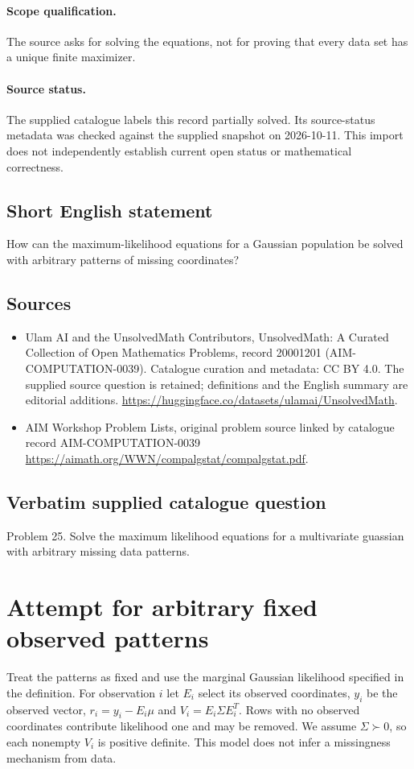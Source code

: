 \documentclass[11pt]{article}
\begin{document}
\paragraph{Scope qualification.}
The source asks for solving the equations, not for proving that every data set has a unique finite maximizer.
\paragraph{Source status.}
The supplied catalogue labels this record partially solved. Its source-status metadata was checked against the supplied snapshot on 2026-10-11. This import does not independently establish current open status or mathematical correctness.
\subsection{Short English statement}
How can the maximum-likelihood equations for a Gaussian population be solved with arbitrary patterns of missing coordinates?
\subsection{Sources}
\begin{itemize}
\item[S1] Ulam AI and the UnsolvedMath Contributors, UnsolvedMath: A Curated Collection of Open Mathematics Problems, record 20001201 (AIM-COMPUTATION-0039). Catalogue curation and metadata: CC BY 4.0. The supplied source question is retained; definitions and the English summary are editorial additions.
\url{https://huggingface.co/datasets/ulamai/UnsolvedMath}.
\item[S2] AIM Workshop Problem Lists, original problem source linked by catalogue record AIM-COMPUTATION-0039
\url{https://aimath.org/WWN/compalgstat/compalgstat.pdf}.
\end{itemize}
\subsection{Verbatim supplied catalogue question}
Problem 25. Solve the maximum likelihood equations for a multivariate guassian with arbitrary missing data patterns.

\section{Attempt for arbitrary fixed observed patterns}
Treat the patterns as fixed and use the marginal Gaussian likelihood
specified in the definition. For observation $i$ let $E_i$ select its
observed coordinates, $y_i$ be the observed vector,
$r_i=y_i-E_i\mu$ and $V_i=E_i\Sigma E_i^T$.
Rows with no observed coordinates contribute likelihood one and may be
removed. We assume $\Sigma\succ0$, so each nonempty $V_i$ is positive
definite. This model does not infer a missingness mechanism from data.
\end{document}
